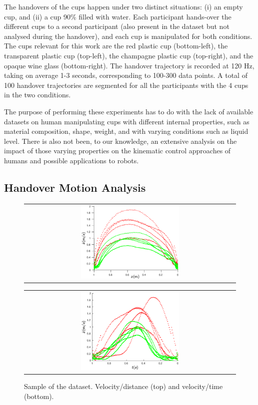 The handovers of the cups happen under two distinct situations: (i) an empty cup, and (ii) a cup 90\% filled with water. Each participant hands-over the different cups to a second participant (also present in the dataset but not analysed during the handover), and each cup is manipulated for both conditions. The cups relevant for this work are the red plastic cup (bottom-left), the transparent plastic cup (top-left), the champagne plastic cup (top-right), and the opaque wine glass (bottom-right). The handover trajectory is recorded at 120 Hz, taking on average 1-3 seconds, corresponding to 100-300 data points. A total of 100 handover trajectories are segmented for all the participants with the 4 cups in the two conditions.

The purpose of performing these experiments has to do with the lack of available datasets on human manipulating cups with different internal properties, such as material composition, shape, weight, and with varying conditions such as liquid level. There is also not been, to our knowledge, an extensive analysis on the impact of those varying properties on the kinematic control approaches of humans and possible applications to robots. 

\subsection{Handover Motion Analysis}

    \begin{figure}
        \centering
        \begin{tabular}{@{}c@{}}
            \centering
            \includegraphics[width=0.48\textwidth,height=0.25\textheight]{Images/vel_distance_plot.eps}
        \end{tabular}
        \baselineskip
        \begin{tabular}{@{}c@{}}
            \centering 
            \includegraphics[width=0.48\textwidth,height=0.25\textheight]{Images/vel_time_plot.eps}
        \end{tabular}
        \caption{Sample of the dataset. Velocity/distance (top) and velocity/time (bottom).}
        \label{fig:vel_distance_time}
    \end{figure}

